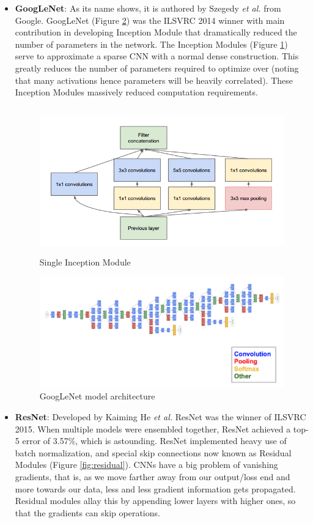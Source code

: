 \documentclass[twoside]{article}
\begin{document}
\begin{itemize}
\item \textbf{GoogLeNet}\cite{googlenet}: As its name shows, it is authored by Szegedy \textit{et al.} from Google. GoogLeNet (Figure \ref{fig:googlenet}) was the ILSVRC 2014 winner with main contribution in developing Inception Module that dramatically reduced the number of parameters in the network. The Inception Modules (Figure \ref{fig:inception}) serve to approximate a sparse CNN with a normal dense construction. This greatly reduces the number of parameters required to optimize over (noting that many activations hence parameters will be heavily correlated). These Inception Modules massively reduced computation requirements.


\begin{figure}[H]
\centering
\includegraphics[height = 2.5in]{pics/InceptionModule.png}
\caption{Single Inception Module}
\label{fig:inception}
\end{figure}

\begin{figure}[!htb]
\centering
\includegraphics[scale=0.33]{pics/GoogLeNet.png}
\caption{GoogLeNet model architecture}
\label{fig:googlenet}
\end{figure}

\item \textbf{ResNet}\cite{resnet}:  Developed by Kaiming He \textit{et al.} ResNet was the winner of ILSVRC 2015. When multiple models were ensembled together, ResNet achieved a top-5 error of 3.57\%, which is astounding. ResNet implemented heavy use of batch normalization, and special skip connections now known as Residual Modules (Figure \ref{fig:residual}). CNNs have a big problem of vanishing gradients, that is, as we move farther away from our output/loss end and more towards our data, less and less gradient information gets propagated. Residual modules allay this by appending lower layers with higher ones, so that the gradients can skip operations. 


\end{itemize}
\end{document}
